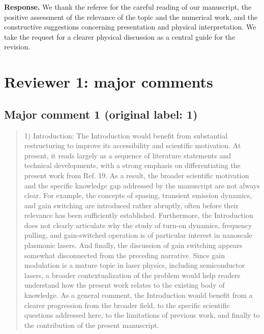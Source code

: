 \documentclass[11pt,a4paper]{article}
\newcommand{\reviewercomment}[1]{\begin{quote}\small #1\end{quote}}
\newcommand{\response}[1]{\par\textbf{Response.} #1\par}
\begin{document}
\response{We thank the referee for the careful reading of our manuscript, the positive assessment of the relevance of the topic and the numerical work, and the constructive suggestions concerning presentation and physical interpretation. We take the request for a clearer physical discussion as a central guide for the revision.}

\section*{Reviewer 1: major comments}

\subsection*{Major comment 1 (original label: 1)}
\label{r1-major-1}
\reviewercomment{
1) Introduction: The Introduction would benefit from substantial restructuring to improve its accessibility and scientific motivation. At present, it reads largely as a sequence of literature statements and technical developments, with a strong emphasis on differentiating the present work from Ref. 19. As a result, the broader scientific motivation and the specific knowledge gap addressed by the manuscript are not always clear. For example, the concepts of spasing, transient emission dynamics, and gain switching are introduced rather abruptly, often before their relevance has been sufficiently established. Furthermore, the Introduction does not clearly articulate why the study of turn-on dynamics, frequency pulling, and gain-switched operation is of particular interest in nanoscale plasmonic lasers. And finally, the discussion of gain switching appears somewhat disconnected from the preceding narrative. Since gain modulation is a mature topic in laser physics, including semiconductor lasers, a broader contextualization of the problem would help readers understand how the present work relates to the existing body of knowledge. As a general comment,  the Introduction would benefit from a clearer progression from the broader field, to the specific scientific questions addressed here, to the limitations of previous work, and finally to the contribution of the present manuscript.
}
\end{document}
